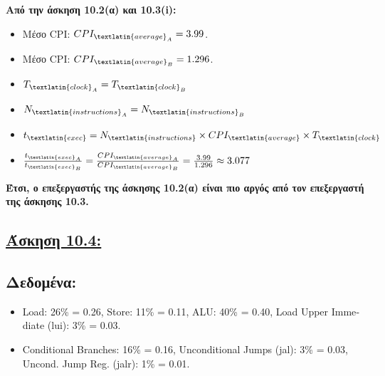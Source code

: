 \documentclass{article}
\newcommand{\skato}{\hspace{0.25cm}}
\begin{document}
\textbf{Από την άσκηση 10.2(α) και 10.3(\textlatin{i}):}
\begin{itemize}
    \item {Μέσο} \textlatin{CPI}: \( CPI_{\textlatin{average}_A} = 3.99 \).
    \item {Μέσο} \textlatin{CPI}: \( CPI_{\textlatin{average}_B} = 1.296 \).
    \item \( T_{\textlatin{clock}_A} = T_{\textlatin{clock}_B}\)
    \item \( N_{\textlatin{instructions}_A} = N_{\textlatin{instructions}_B} \)
    \item $ t_{\textlatin{exec}} = N_{\textlatin{instructions}} \times CPI_{\textlatin{average}} \times T_{\textlatin{clock}} $
    \item $ \frac{t_{\textlatin{exec}_A}}{t_{\textlatin{exec}_B}} = \frac{CPI_{\textlatin{average}_A}}{CPI_{\textlatin{average}_B}} = \frac{3.99}{1.296} \approx 3.077 $
\end{itemize}
\textbf{Έτσι, ο επεξεργαστής της άσκησης 10.2(α) είναι πιο αργός από τον επεξεργαστή της άσκησης 10.3.}















\newpage
\subsection*{\underline{\textbf{Άσκηση 10.4:}}}
\vspace{0.5cm}





\subsection*{\textbf{Δεδομένα:}}

\begin{itemize}
    \item \textlatin{Load}: 26\% = 0.26, \skato \textlatin{Store}: 11\% = 0.11, \skato \textlatin{ALU}: 40\% = 0.40, \skato \textlatin{Load Upper Immediate (lui)}: 3\% = 0.03.
    \item \textlatin{Conditional Branches}: 16\% = 0.16, \skato \textlatin{Unconditional Jumps (jal)}: 3\% = 0.03, \skato \textlatin{Uncond. Jump Reg. (jalr)}: 1\% = 0.01.
\end{itemize}
\end{document}
